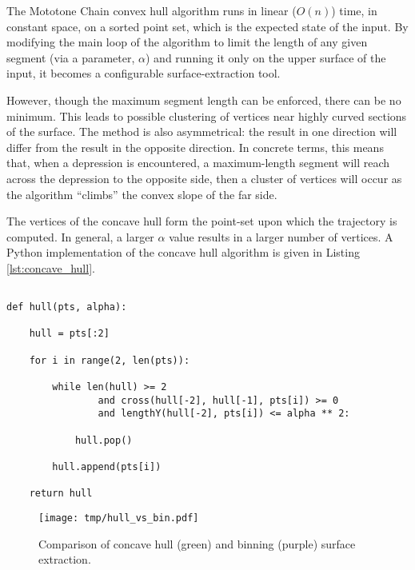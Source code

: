 \documentclass[doc]{apa6}
\begin{document}
The Mototone Chain convex hull algorithm \parencite{Andrew1979} runs in linear ($O(n)$) time, in constant space, on a sorted point set, which is the expected state of the input. By modifying the main loop of the algorithm to limit the length of any given segment (via a parameter, $\alpha$) and running it only on the upper surface of the input, it becomes a configurable surface-extraction tool. 

However, though the maximum segment length can be enforced, there can be no minimum. This leads to possible clustering of vertices near highly curved sections of the surface. The method is also asymmetrical: the result in one direction will differ from the result in the opposite direction. In concrete terms, this means that, when a depression is encountered, a maximum-length segment will reach across the depression to the opposite side, then a cluster of vertices will occur as the algorithm ``climbs'' the convex slope of the far side.

The vertices of the concave hull form the point-set upon which the trajectory is computed. In general, a larger $\alpha$ value results in a larger number of vertices. A Python implementation of the concave hull algorithm is given in Listing \ref{lst:concave_hull}. 

\begin{listing}
\begin{verbatim}

def hull(pts, alpha):

	hull = pts[:2]

	for i in range(2, len(pts)):
	
		while len(hull) >= 2 
				and cross(hull[-2], hull[-1], pts[i]) >= 0 
				and lengthY(hull[-2], pts[i]) <= alpha ** 2:

			hull.pop()

		hull.append(pts[i])

	return hull

\end{verbatim}
\caption{Modified Monotone Chain algorithm for constructing a convex hull. The \lstinline{cross} function determines whether the segment makes a clockwise or counterclockwise turn; \lstinline{lengthY} gives the distance between points in $y$. The \lstinline{pts} array is a list of points, sorted on $y$; \lstinline{alpha} is the maximum segment length.}
\label{lst:concave_hull}
\end{listing}

\begin{wrapfigure}{r}{0.5\textwidth} %
\begin{center}
\texttt{[image: tmp/hull\_vs\_bin.pdf]} 
\end{center}
\caption{Comparison of concave hull (green) and binning (purple) surface extraction.}
\label{fig:bin_vs_hull}
\end{wrapfigure}
\end{document}
